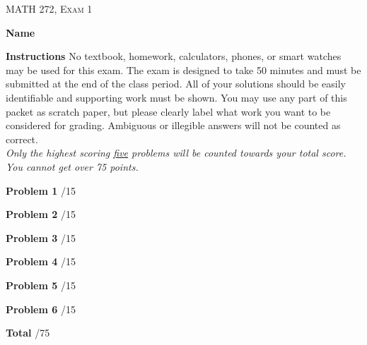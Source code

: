 \documentclass[12pt]{amsbook}
\begin{document}

\begin{center}
   \textsc{\large MATH 272, Exam 1}\\
\end{center}
\vspace{1cm}

\noindent\textbf{Name} \; \underline{\hspace{8cm}}

\vspace{1cm}

\noindent\textbf{Instructions} \; No textbook, homework, calculators, phones, or smart watches may be used for this exam. The exam is designed to take 50 minutes and must be submitted at the end of the class period. All of your solutions should be easily identifiable and supporting work must be shown. You may use any part of this packet as scratch paper, but please clearly label what work you want to be considered for grading. Ambiguous or illegible answers will not be counted as correct.\\

\noindent\emph{Only the highest scoring \underline{five} problems will be counted towards your total score. You cannot get over 75 points.}

\vspace{1cm}

\begin{flushleft}
\textbf{Problem 1} \; \underline{\hspace{1cm}}/15

\vspace{.25cm}

\textbf{Problem 2} \; \underline{\hspace{1cm}}/15

\vspace{.25cm}

\textbf{Problem 3} \; \underline{\hspace{1cm}}/15

\vspace{.25cm}

\textbf{Problem 4} \; \underline{\hspace{1cm}}/15

\vspace{.25cm}

\textbf{Problem 5} \; \underline{\hspace{1cm}}/15

\vspace{.25cm}

\textbf{Problem 6} \; \underline{\hspace{1cm}}/15

\vspace{.5cm}

\textbf{Total} \;\hspace{1.1cm} \underline{\hspace{1.25cm}}/75
\end{flushleft}
\end{document}

